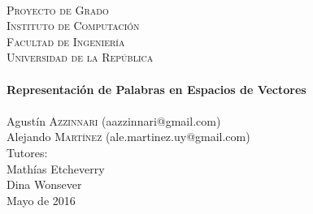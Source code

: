 \begin{titlepage}
  \begin{center}
    \textsc{\LARGE}\\[1.0cm]
    \textsc{\LARGE Proyecto de Grado}\\[1.5cm]

    \textsc{\Large Instituto de Computación}\\[0.2cm]
    \textsc{\Large Facultad de Ingeniería}\\[0.2cm]
    \textsc{\Large Universidad de la República}\\[2.0cm]

    \HRule\\[0.6cm]
    {\Huge \bfseries Representación de Palabras en Espacios de Vectores}\\[0.3cm]
    \HRule\\[2.3cm]

    {\Large Agustín \textsc{Azzinnari}} {\small (aazzinnari@gmail.com)}\\
    {\Large Alejando \textsc{Martínez}} {\small (ale.martinez.uy@gmail.com)}\\[2.0cm]

    {\small Tutores:}\\
    {\normalsize Mathías Etcheverry}\\
    {\normalsize Dina Wonsever}\\[1.5cm]

    Mayo de 2016\\



    \vfill

  \end{center}
\end{titlepage}